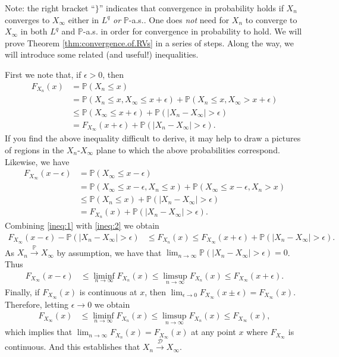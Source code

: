 \documentclass[12pt]{book}
\let\varepsilon\epsilon
\numberwithin{equation}{chapter}
\theoremstyle{plain}
\numberwithin{theorem}{section}
\theoremstyle{definition}
\numberwithin{exercise}{chapter}
\let\oldendproof\endproof
\renewenvironment{proof}[1][\proofname]{%
  \oldproof[\scshape\underline{#1}]%
}{\oldendproof}
\newcommand{\<}{\langle}
\renewcommand{\>}{\rangle}
\renewcommand{\(}{\left(}
\renewcommand{\)}{\right)}
\renewcommand{\[}{\left[}
\renewcommand{\]}{\right]}
\newcommand\Pb{\mathds{P}}
\newcommand\Dc{\mathscr{D}}
\newcommand\eps{\varepsilon}
\begin{document}
\noindent
Note: the right bracket ``$\}$'' indicates that convergence in probability holds if $X_n$ converges to $X_\infty$ either in $L^q$ \textit{or} $\Pb$-a.s..
One does \textit{not} need for $X_n$ to converge to $X_\infty$ in both $L^q$ and $\Pb$-a.s. in order for convergence in probability to hold.
We will prove Theorem \ref{thm:convergence.of.RVs} in a series of steps.  Along the way, we will introduce some related (and useful!) inequalities.

\begin{proof}[Proof that $X_n \stackrel{\Pb}{\to} X_\infty \Rightarrow X_n \stackrel{\Dc}{\to} X_\infty$]
First we note that, if $\eps > 0$, then
\begin{align}
F_{X_n}(x)
	&=	\Pb( X_n \leq x) \\
	&=	\Pb( X_n \leq x, X_\infty \leq x + \eps) + \Pb( X_n \leq x, X_\infty > x + \eps)  \\
	&\leq	\Pb( X_\infty \leq x + \eps ) + \Pb(|X_n - X_\infty| > \eps ) \\
	&=	F_{X_\infty}(x + \eps) + \Pb(|X_n - X_\infty| > \eps ) . \label{ineq:1}
\end{align}
If you find the above inequality difficult to derive, it may help to draw a pictures of regions in the $X_n$-$X_\infty$ plane to which the above probabilities correspond.  Likewise, we have
\begin{align}
F_{X_\infty}(x-\eps)
	&=	\Pb( X_\infty \leq x - \eps ) \\
	&=	\Pb( X_\infty \leq x - \eps, X_n \leq x ) + \Pb( X_\infty \leq x - \eps, X_n > x ) \\
	&\leq \Pb( X_n \leq x) + \Pb(|X_n - X_\infty| > \eps ) \\
	&=	F_{X_n}(x) + \Pb(|X_n - X_\infty| > \eps ) . \label{ineq:2}
\end{align}
Combining \eqref{ineq:1} with \eqref{ineq:2} we obtain
\begin{align}
F_{X_\infty}(x-\eps) - \Pb(|X_n - X_\infty| > \eps )
	&\leq F_{X_n}(x)
	 \leq F_{X_\infty}(x + \eps) + \Pb(|X_n - X_\infty| > \eps ) .
\end{align}
As $X_n \stackrel{\Pb}{\to} X_\infty$ by assumption, we have that $\lim_{n \to \infty} \Pb(|X_n - X_\infty| > \eps ) = 0$.  Thus
\begin{align}
F_{X_\infty}(x-\eps)
	&\leq \operatorname*{lim inf}_{n \to \infty} F_{X_n}(x)
	 \leq \operatorname*{lim sup}_{n \to \infty} F_{X_n}(x)
	 \leq F_{X_\infty}(x + \eps) .
\end{align}
Finally, if $F_{X_\infty}(x)$ is continuous at $x$, then $\lim_{\eps \to 0} F_{X_\infty}(x \pm \eps) = F_{X_\infty}(x)$.  Therefore, letting $\eps \to 0$ we obtain
\begin{align}
F_{X_\infty}(x)
	&\leq \operatorname*{lim inf}_{n \to \infty} F_{X_n}(x)
	 \leq \operatorname*{lim sup}_{n \to \infty} F_{X_n}(x)
	 \leq F_{X_\infty}(x) ,
\end{align}
which implies that $\lim_{n \to \infty} F_{X_n}(x) = F_{X_\infty}(x)$ at any point $x$ where $F_{X_\infty}$ is continuous.  And this establishes that $X_n \stackrel{\Dc}{\to} X_\infty$.
\end{proof}
\end{document}
